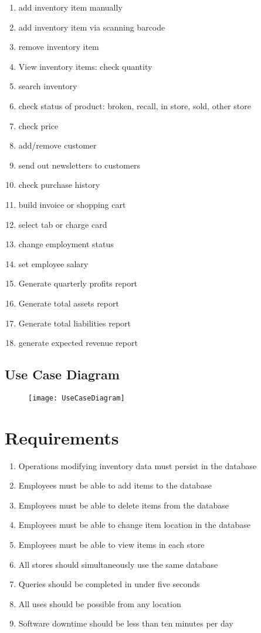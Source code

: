 \documentclass[letterpaper, 12pt]{article}
\begin{document}
\begin{enumerate}
\item add inventory item manually
\item add inventory item via scanning barcode
\item remove inventory item
\item View inventory items: check quantity
\item search inventory
\item check status of product: broken, recall, in store, sold, other store
\item check price
\item add/remove customer
\item send out newsletters to customers
\item check purchase history
\item build invoice or shopping cart
\item select tab or charge card
\item change employment status
\item set employee salary
\item Generate quarterly profits report
\item Generate total assets report
\item Generate total liabilities report
\item generate expected revenue report
\end{enumerate}

\subsection{Use Case Diagram}

\begin{figure}[ht!]
  \centering
  \texttt{[image: UseCaseDiagram]}
\end{figure}



\section{Requirements}

\begin{enumerate}
\item Operations modifying inventory data must persist in the database
\item Employees must be able to add items to the database
\item Employees must be able to delete items from the database
\item Employees must be able to change item location in the database
\item Employees must be able to view items in each store
\item All stores should simultaneously use the same database
\item Queries should be completed in under five seconds
\item All uses should be possible from any location
\item Software downtime should be less than ten minutes per day
\end{enumerate}
\end{document}
